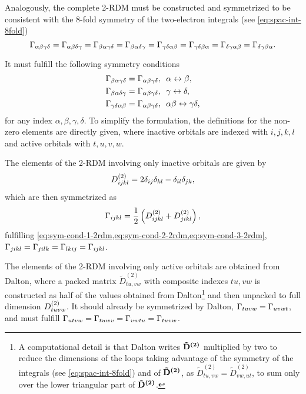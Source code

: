 Analogously, the complete 2-RDM must be constructed and symmetrized
to be consistent with the 8-fold symmetry of the
two-electron integrals (see \cref{eq:spac-int-8fold})
\begin{equation} \label{eq:sym-2rdm}
    \Gamma_{\alpha \beta \gamma \delta } = 
    \Gamma_{\alpha \beta \delta \gamma } = 
    \Gamma_{\beta \alpha \gamma \delta } = 
    \Gamma_{\beta \alpha \delta \gamma } = 
    \Gamma_{\gamma \delta \alpha \beta } = 
    \Gamma_{\gamma \delta \beta \alpha } = 
    \Gamma_{\delta \gamma \alpha \beta } = 
    \Gamma_{\delta \gamma \beta \alpha }
    .
\end{equation}

It must fulfill the following symmetry conditions
\begin{align}
    \label{eq:sym-cond-1-2rdm}
    \Gamma_{\beta\alpha\gamma\delta} = \Gamma_{\alpha\beta\gamma\delta},\ \ & \alpha \leftrightarrow \beta ,\\
    \label{eq:sym-cond-2-2rdm}
    \Gamma_{\beta\alpha\delta\gamma} = \Gamma_{\alpha\beta\gamma\delta},\ \ & \gamma \leftrightarrow \delta ,\\         
    \label{eq:sym-cond-3-2rdm}
    \Gamma_{\gamma\delta\alpha\beta} = \Gamma_{\alpha\beta\gamma\delta},\ \ & \alpha\beta \leftrightarrow \gamma \delta , 
\end{align}
for any index $\alpha, \beta, \gamma, \delta$.
To simplify the formulation, the definitions for the non-zero elements are
directly given, where inactive orbitals are
indexed with $i,j,k,l$ and active orbitals with $t,u,v,w$.

The elements of the 2-RDM involving only inactive orbitals are given by 
\begin{equation}
    D^{\left( 2 \right)}_{ijkl} = 
    2 \delta_{ij} \delta_{kl} - \delta_{il} \delta_{jk}
    ,
\end{equation}
which are then symmetrized as 
\begin{equation}
    \Gamma_{ijkl} =
    \frac{1}{2} \left( D^{\left( 2 \right)}_{ijkl} + D^{\left( 2 \right)}_{jikl} \right)
    ,
\end{equation}
fulfilling \cref{eq:sym-cond-1-2rdm,eq:sym-cond-2-2rdm,eq:sym-cond-3-2rdm}, 
$\Gamma_{jikl} = \Gamma_{jilk} = \Gamma_{lkij} = \Gamma_{ijkl}$.

The elements of the 2-RDM involving only active orbitals are obtained from Dalton,
where a packed matrix $\tilde{D}_{tu,vw}^{(2)}$ with composite indexes $tu,vw$ is
constructed as half of the values obtained from Dalton\footnote{A computational
    detail is that Dalton writes $\boldsymbol{\mathrm{\tilde{D}^{(2)}}}$ multiplied by two to
    reduce the dimensions of the loops taking advantage of the symmetry of the
    integrals (see \cref{eq:spac-int-8fold}) and of $\boldsymbol{\mathrm{\tilde{D}^{(2)}}}$, as 
    $\tilde{D}_{tu,vw}^{(2)} = \tilde{D}_{vw,ut}^{(2)}$,
    to sum only over the lower triangular part of $ \boldsymbol{\mathrm{\tilde{D}^{(2)}}}$.
} and then
unpacked to full dimension $D^{\left( 2 \right)}_{tuvw}$.
It should already be symmetrized by Dalton, $\Gamma_{tuvw} = \Gamma_{uvwt}$, and
must fulfill
$\Gamma_{utvw} = \Gamma_{tuwv} = \Gamma_{vwtu} = \Gamma_{tuvw}$.

